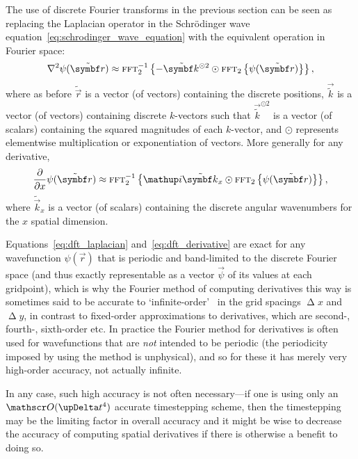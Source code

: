 The use of discrete Fourier transforms in the previous section can be seen as replacing the Laplacian operator in the Schr\"odinger wave equation~\eqref{eq:schrodinger_wave_equation} with the equivalent operation in Fourier space:
\begin{align}\label{eq:dft_laplacian}
\nabla^2\psi(\tilde{\vec r}) \approx \fft_2^{-1}\left\{-\tilde{\vec k}^{\odot 2} \odot \fft_2\left\{\psi(\tilde{\vec r})\right\}\right\},
\end{align}
where as before $\tilde{\vec r}$ is a vector (of vectors) containing the discrete positions, $\vec{\tilde k}$ is a vector (of vectors) containing discrete $k$-vectors such that $\vec{\tilde k}^{\odot 2}$ is a vector (of scalars) containing the squared magnitudes of each $k$-vector, and $\odot$ represents elementwise multiplication or exponentiation of vectors. More generally for any derivative,
\begin{align}\label{eq:dft_derivative}
\pdv{x}\psi(\tilde{\vec r}) \approx \fft_2^{-1}\left\{\ii\tilde{\vec k}_x \odot \fft_2\left\{\psi(\tilde{\vec r})\right\}\right\},
\end{align}
where $\tilde{\vec k}_x$ is a vector (of scalars) containing the discrete angular wavenumbers for the $x$ spatial dimension.

Equations~\eqref{eq:dft_laplacian} and~\eqref{eq:dft_derivative} are exact for any wavefunction $\psi(\vec r)$ that is periodic and band-limited to the discrete Fourier space (and thus exactly representable as a vector $\vec \psi$ of its values at each gridpoint), which is why the Fourier method of computing derivatives this way is sometimes said to be accurate to `infinite-order'~\cite{fornberg_pseudospectral_1987} in the grid spacings $\upDelta x$ and $\upDelta y$, in contrast to fixed-order approximations to derivatives, which are second-, fourth-, sixth-order etc. In practice the Fourier method for derivatives is often used for wavefunctions that are \emph{not} intended to be periodic (the periodicity imposed by using the method is unphysical), and so for these it has merely very high-order accuracy, not actually infinite. 

In any case, such high accuracy is not often necessary---if one is using only an $\Ord{\upDelta t^4}$ accurate timestepping scheme, then the timestepping may be the limiting factor in overall accuracy and it might be wise to decrease the accuracy of computing spatial derivatives if there is otherwise a benefit to doing so.


